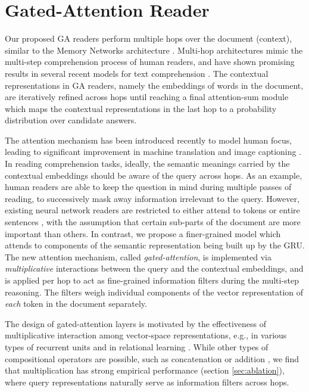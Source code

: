 \documentclass[11pt,a4paper]{article}
\begin{document}
\section{Gated-Attention Reader}
\label{sec:ga}




Our proposed GA readers perform multiple hops over the document (context), similar to the Memory Networks architecture \citep{sukhbaatar2015end}.
Multi-hop architectures mimic the multi-step comprehension process of human readers,
and have shown promising results in several recent models for text comprehension \citep{sordoni2016iterative, kumar2015ask, shen2016reasonet}.
The contextual representations in GA readers,
namely the embeddings of words in the document,
are iteratively refined across hops
until reaching a final attention-sum module \citep{kadlec2016text} which maps 
the contextual representations in the last hop to a probability distribution over candidate answers.

The attention mechanism has been introduced recently to model human focus,
leading to significant improvement in machine translation and image captioning \citep{bahdanau2014neural, mnih2014recurrent}.
In reading comprehension tasks, ideally,
the semantic meanings carried by the contextual embeddings should be aware of the query across hops.
As an example,
human readers are able to keep the question in mind during multiple passes of reading,
to successively mask away information irrelevant to the query.
However,
existing neural network readers are restricted to either attend to tokens \citep{hermann2015teaching, chen2016thorough}
or entire sentences \citep{weston2014memory}, with the assumption that certain sub-parts of the document are more important than others.
In contrast, 
we propose a finer-grained model which attends to components of the semantic representation being built up by the GRU.
The new attention mechanism,
called \emph{gated-attention},
is implemented via \emph{multiplicative} interactions between the query and the contextual embeddings,
and is applied per hop to act as fine-grained information filters during the multi-step reasoning. The filters weigh individual components of the vector representation of \textit{each} token in the document separately.

The design of gated-attention layers is motivated by the effectiveness of multiplicative interaction
among vector-space representations,
e.g., in various types of recurrent units \citep{hochreiter1997long, wu2016multiplicative} and in relational learning \citep{yang2014learning, kiros2014multiplicative}.
While other types of compositional operators are possible,
such as concatenation or addition \citep{mitchell2008vector},
we find that multiplication has strong empirical performance
(section \ref{sec:ablation}),
where query representations naturally serve as information filters
across hops.
\end{document}

